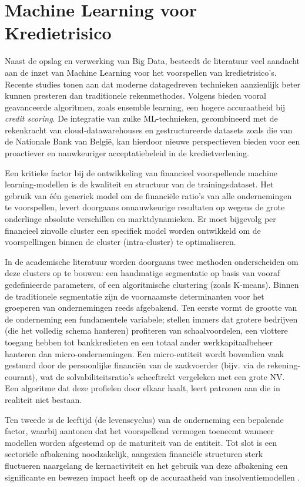 \section{Machine Learning voor Kredietrisico}

Naast de opslag en verwerking van Big Data, besteedt de literatuur veel aandacht aan de inzet van Machine Learning voor het voorspellen van kredietrisico's. Recente studies tonen aan dat moderne datagedreven technieken aanzienlijk beter kunnen presteren dan traditionele rekenmethodes. Volgens \textcite{Moscato2021} bieden vooral geavanceerde algoritmen, zoals ensemble learning, een hogere accuraatheid bij \textit{credit scoring}. De integratie van zulke ML-technieken, gecombineerd met de rekenkracht van cloud-datawarehouses en gestructureerde datasets zoals die van de Nationale Bank van België, kan hierdoor nieuwe perspectieven bieden voor een proactiever en nauwkeuriger acceptatiebeleid in de kredietverlening.

Een kritieke factor bij de ontwikkeling van financieel voorspellende machine learning-modellen is de kwaliteit en structuur van de trainingsdataset. Het gebruik van één generiek model om de financiële ratio's van alle ondernemingen te voorspellen, levert doorgaans onnauwkeurige resultaten op wegens de grote onderlinge absolute verschillen en marktdynamieken. Er moet bijgevolg per financieel zinvolle cluster een specifiek model worden ontwikkeld om de voorspellingen binnen de cluster (intra-cluster) te optimaliseren.

In de academische literatuur worden doorgaans twee methoden onderscheiden om deze clusters op te bouwen: een handmatige segmentatie op basis van vooraf gedefinieerde parameters, of een algoritmische clustering (zoals K-means). Binnen de traditionele segmentatie zijn de voornaamste determinanten voor het groeperen van ondernemingen reeds afgebakend. Ten eerste vormt de grootte van de onderneming een fundamentele variabele; \textcite{cultrera2016} stellen immers dat grotere bedrijven (die het volledig schema hanteren) profiteren van schaalvoordelen, een vlottere toegang hebben tot bankkredieten en een totaal ander werkkapitaalbeheer hanteren dan micro-ondernemingen. Een micro-entiteit wordt bovendien vaak gestuurd door de persoonlijke financiën van de zaakvoerder (bijv. via de rekening-courant), wat de solvabiliteitsratio's scheeftrekt vergeleken met een grote NV. Een algoritme dat deze profielen door elkaar haalt, leert patronen aan die in realiteit niet bestaan.

Ten tweede is de leeftijd (de levenscyclus) van de onderneming een bepalende factor, waarbij \textcite{cho2020} aantonen dat het voorspellend vermogen toeneemt wanneer modellen worden afgestemd op de maturiteit van de entiteit. Tot slot is een sectoriële afbakening noodzakelijk, aangezien financiële structuren sterk fluctueren naargelang de kernactiviteit en het gebruik van deze afbakening een significante en bewezen impact heeft op de accuraatheid van insolventiemodellen \autocite{chava2004bankruptcy}.

